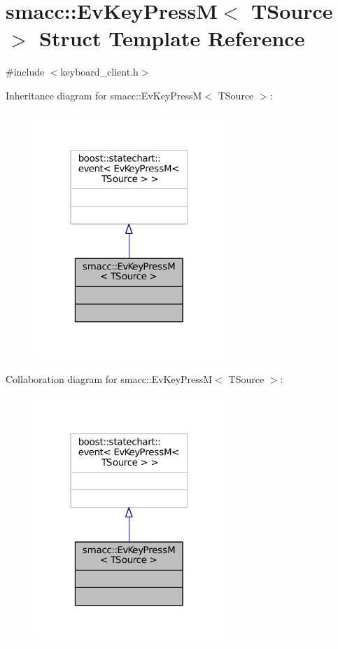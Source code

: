 \hypertarget{structsmacc_1_1EvKeyPressM}{}\section{smacc\+:\+:Ev\+Key\+PressM$<$ T\+Source $>$ Struct Template Reference}
\label{structsmacc_1_1EvKeyPressM}


{\ttfamily \#include $<$keyboard\+\_\+client.\+h$>$}



Inheritance diagram for smacc\+:\+:Ev\+Key\+PressM$<$ T\+Source $>$\+:
\nopagebreak
\begin{figure}[H]
\begin{center}
\leavevmode
\includegraphics[width=205pt]{structsmacc_1_1EvKeyPressM__inherit__graph}
\end{center}
\end{figure}


Collaboration diagram for smacc\+:\+:Ev\+Key\+PressM$<$ T\+Source $>$\+:
\nopagebreak
\begin{figure}[H]
\begin{center}
\leavevmode
\includegraphics[width=205pt]{structsmacc_1_1EvKeyPressM__coll__graph}
\end{center}
\end{figure}


